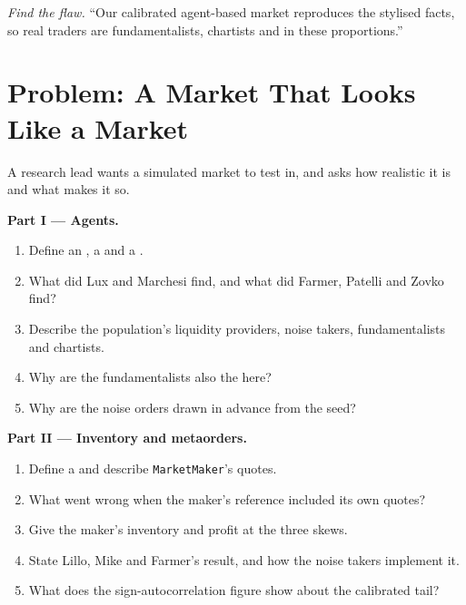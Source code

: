 \begin{exercise}[$\star\star\star$]\label{exo:mx:build-an-agent-based-market:8}
\emph{Find the flaw.} ``Our calibrated agent-based market reproduces the stylised facts, so real traders are fundamentalists, chartists and  in these proportions.''
\end{exercise}

\section{Problem: A Market That Looks Like a Market}

\begin{problem}\label{pb:mx:build-an-agent-based-market:1}
A research lead wants a simulated market to test  in, and asks how realistic it is and what makes it so.

\medskip\noindent\textbf{Part I --- Agents.}
\begin{enumerate}
\item Define an , a  and a .
\item What did Lux and Marchesi find, and what did Farmer, Patelli and Zovko find?
\item Describe the population's liquidity providers, noise takers, fundamentalists and chartists.
\item Why are the fundamentalists also the  here?
\item Why are the noise orders drawn in advance from the seed?
\end{enumerate}

\medskip\noindent\textbf{Part II --- Inventory and metaorders.}
\begin{enumerate}[resume]
\item Define a  and describe \texttt{MarketMaker}'s quotes.
\item What went wrong when the maker's reference included its own quotes?
\item Give the maker's inventory and profit at the three skews.
\item State Lillo, Mike and Farmer's result, and how the noise takers implement it.
\item What does the sign-autocorrelation figure show about the calibrated tail?
\end{enumerate}


\end{problem}
